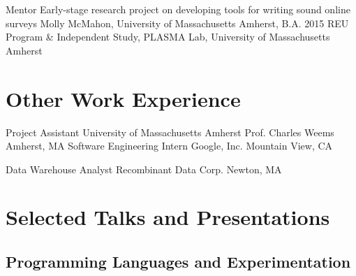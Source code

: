 \documentclass[11pt,a4paper,sans]{moderncv} %
\newcommand{\umass}{University of Massachusetts Amherst}
\begin{document}
{Mentor}
    {Early-stage research project on developing tools for writing sound online surveys}
    {Molly McMahon, \umass{}, B.A. 2015}
    {}
    {REU Program \& Independent Study, PLASMA Lab, University of Massachusetts Amherst}
    





\section{Other Work Experience}

 {Project Assistant}  
 {\umass{}} 
 {Prof. Charles Weems}
 {Amherst, MA}
 {}
{Software Engineering Intern} 
{Google, Inc.}
{}
{Mountain View, CA}
{}

{Data Warehouse Analyst} 
{Recombinant Data Corp.}
{}
{Newton, MA}
{}
\newpage
\section{Selected Talks and Presentations}

\subsection{Programming Languages and Experimentation}
\end{document}
